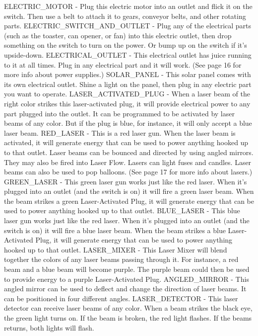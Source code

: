 ELECTRIC_MOTOR - Plug this electric motor into an outlet and flick it on the switch. Then use a belt to attach it to gears, conveyor belts, and other rotating parts.
ELECTRIC_SWITCH_AND_OUTLET - Plug any of the electrical parts (such as the toaster, can opener, or fan) into this electric outlet, then drop something on the switch to turn on the power. Or bump up on the switch if it’s upside-down.
ELECTRICAL_OUTLET - This electrical outlet has juice running to it at all times. Plug in any electrical part and it will work. (See page 16 for more info about power supplies.)
SOLAR_PANEL - This solar panel comes with its own electrical outlet. Shine a light on the panel, then plug in any electric part you want to operate.
LASER_ACTIVATED_PLUG - When a laser beam of the right color strikes this laser-activated plug, it will provide electrical power to any part plugged into the outlet. It can be programmed to be activated by laser beams of any color. But if the plug is blue, for instance, it will only accept a blue laser beam.
RED_LASER - This is a red laser gun. When the laser beam is activated, it will generate energy that can be used to power anything hooked up to that outlet. Laser beams can be bounced and directed by using angled mirrors. They may also be fired into Laser Flow. Lasers can light fuses and candles. Laser beams can also be used to pop balloons. (See page 17 for more info about lasers.)
GREEN_LASER - This green laser gun works just like the red laser. When it's plugged into an outlet (and the switch is on) it will fire a green laser beam. When the beam strikes a green Laser-Activated Plug, it will generate energy that can be used to power anything hooked up to that outlet.
BLUE_LASER - This blue laser gun works just like the red laser. When it's plugged into an outlet (and the switch is on) it will fire a blue laser beam. When the beam strikes a blue Laser-Activated Plug, it will generate energy that can be used to power anything hooked up to that outlet.
LASER_MIXER - This Laser Mixer will blend together the colors of any laser beams passing through it. For instance, a red beam and a blue beam will become purple. The purple beam could then be used to provide energy to a purple Laser-Activated Plug.
ANGLED_MIRROR - This angled mirror can be used to deflect and change the direction of laser beams. It can be positioned in four different angles.
LASER_DETECTOR - This laser detector can receive laser beams of any color. When a beam strikes the black eye, the green light turns on. If the beam is broken, the red light flashes. If the beams returns, both lights will flash.
